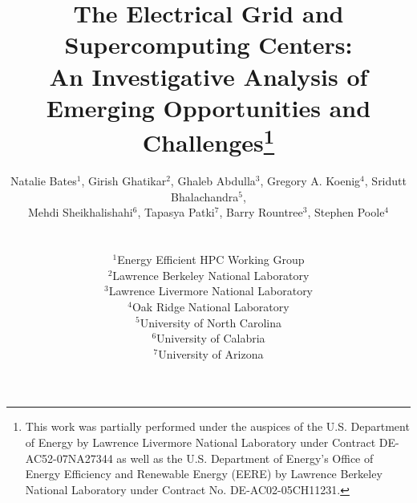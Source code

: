 \documentclass{../style/sig-alternate}
\begin{document}
%

\title{
The Electrical Grid and Supercomputing Centers:\\
An Investigative Analysis of Emerging Opportunities and Challenges\thanks{This work was partially performed under the auspices of the U.S. Department of Energy by Lawrence Livermore National Laboratory under Contract DE-AC52-07NA27344 as well as the U.S. Department of Energy's Office of Energy Efficiency and Renewable Energy (EERE) by Lawrence Berkeley National Laboratory under Contract No. DE-AC02-05CH11231.}
}


\author{Natalie Bates$^1$, Girish Ghatikar$^2$,
 Ghaleb Abdulla$^3$, Gregory A. Koenig$^4$, Sridutt Bhalachandra$^5$, \\
	Mehdi Sheikhalishahi$^6$, Tapasya Patki$^7$, Barry Rountree$^3$, Stephen Poole$^4$
	\\ \\ \\
	$^1$Energy Efficient HPC Working Group\\
       $^2$Lawrence Berkeley National Laboratory\\
       $^3$Lawrence Livermore National Laboratory\\
			 $^4$Oak Ridge National Laboratory\\
			 $^5$University of North Carolina\\
			$^6$University of Calabria\\
			$^7$University of Arizona
	}


\maketitle              %

\end{document}
